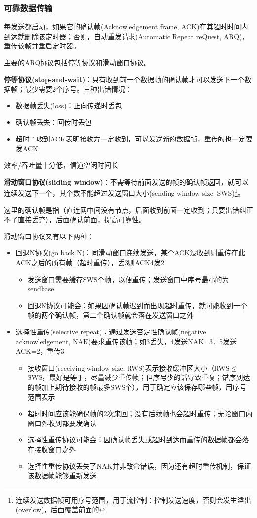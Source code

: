 \subsubsection{可靠数据传输}
每发送都启动，如果它的确认帧(Acknowledgement frame, ACK)在其超时时间内到达就删除该定时器；否则，自动重发请求(Automatic Repeat reQuest, ARQ)，重传该帧并重启定时器。

主要的ARQ协议包括\underline{停等协议}和\underline{滑动窗口协议}。

\myhline
\textbf{停等协议(stop-and-wait)}：只有收到前一个数据帧的确认帧才可以发送下一个数据帧；最少需要2个序号。三种出错情况：
\begin{itemize}
	\item 数据帧丢失(loss)：正向传递时丢包
	\item 确认帧丢失：回传时丢包
	\item 超时：收到ACK表明接收方一定收到，可以发送新的数据帧，重传的也一定要发ACK
\end{itemize}
效率/吞吐量十分低，信道空闲时间长

\myhline
\textbf{滑动窗口协议(sliding window)}：不需等待前面发送的帧的确认帧返回，就可以连续发送下一个，其个数不能超过发送窗口大小(sending window size, SWS)\footnote{连续发送数据帧可用序号范围，用于流控制：控制发送速度，否则会发生溢出(overlow)，后面覆盖前面的}。

这里的确认帧是指（直连网中间没有节点，后面收到前面一定收到；只要出错纠正不了直接丢弃），后面确认前面，提高可靠性。

滑动窗口协议又有以下两种：
\begin{itemize}
\item 回退N协议(go back N)：同滑动窗口连续发送，某个ACK没收到则重传在此ACK之后的所有帧（超时重传），丢3则ACK4发2
\begin{itemize}
	\item 发送窗口需要缓存SWS个帧，以便重传；发送窗口中序号最小的为sendbase
	\item 回退N协议可能会：如果因确认帧迟到而出现超时重传，就可能收到一个帧的两个确认帧，第二个确认帧就会落在发送窗口之外
\end{itemize}
\item 选择性重传(selective repeat)：通过发送否定性确认帧(negative acknowledgement, NAK)要求重传该帧；如3丢失，4发送NAK=3，5发送ACK=2，重传3
\begin{itemize}
	\item 接收窗口(receiving window size, RWS)表示接收缓冲区大小（RWS$\leq$SWS，最好是等于，尽量减少重传帧；但序号少的话导致重复；错序到达的帧加上期待接收的帧最多SWS个），用于确定应该保存哪些帧，用序号范围表示
	\item 超时时间应该能确保帧的2次来回；没有后续帧也会超时重传；无论窗口内窗口外收到都要发确认
	\item 选择性重传协议可能会：因确认帧丢失或超时到达而重传的数据帧都会落在接收窗口之外
	\item 选择性重传协议丢失了NAK并非致命错误，因为还有超时重传机制，保证该数据帧能够重新发送
\end{itemize}
\end{itemize}


